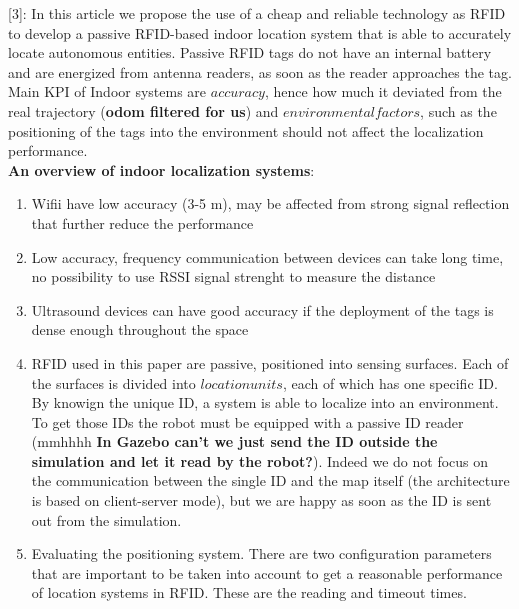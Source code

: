 \documentclass[11pt,a4paper]{article}
\begin{document}
[3]: In this article we propose the use of a cheap and reliable technology as RFID to develop a passive RFID-based indoor location system that is able to accurately locate autonomous entities. Passive RFID tags do not have an internal battery and are energized from antenna readers, as soon as the reader approaches the tag. Main KPI of Indoor systems are $accuracy$, hence how much it deviated from the real trajectory (\textbf{odom filtered for us}) and $environmental factors$, such as the positioning of the tags into the environment should not affect the localization performance. \\
\textbf{An overview of indoor localization systems}: 
\begin{enumerate}
\item Wifii have low accuracy (3-5 m), may be affected from strong signal reflection that further reduce the performance
\item Low accuracy, frequency communication between devices can take long time, no possibility to use RSSI signal strenght to measure the distance
\item Ultrasound devices can have good accuracy if the deployment of the tags is dense enough throughout the space
\item RFID used in this paper are passive, positioned into sensing surfaces. Each of the surfaces is divided into $location units$, each of which has one specific ID. By knowign the unique ID, a system is able to localize into an environment. To get those IDs the robot must be equipped with a passive ID reader (mmhhhh \textbf{In Gazebo can't we just send the ID outside the simulation and let it read by the robot?}). Indeed we do not focus on the communication between the single ID and the map itself (the architecture is based on client-server mode), but we are happy as soon as the ID is sent out from the simulation.
\item Evaluating the positioning system. There are two configuration parameters that are important to be taken into account to get a reasonable performance of location
systems in RFID. These are the reading and timeout times. 
\end{enumerate}
\end{document}
